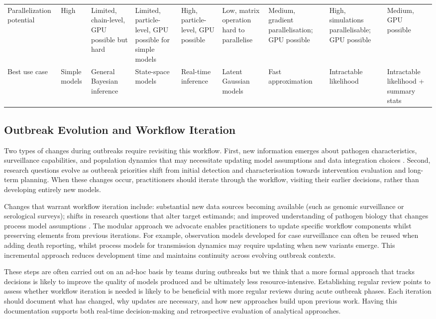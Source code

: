 \documentclass{article}
\begin{document}
\begin{landscape}
\begin{table}[ht]
\begin{tabular}{@{}p{3.2cm}p{1.5cm}p{1.5cm}p{1.5cm}p{1.5cm}p{1.5cm}p{1.5cm}p{1.5cm}p{1.5cm}@{}}
Parallelization potential & 
High & 
Limited, chain-level, GPU possible but hard & 
Limited, particle-level, GPU possible for simple models & 
High, particle-level, GPU possible & 
Low, matrix operation hard to parallelise & 
Medium, gradient parallelisation; GPU possible & 
High, simulations parallelisable; GPU possible & 
Medium, GPU possible \\
Best use case & Simple models & General Bayesian inference & State-space models & Real-time inference & Latent Gaussian models & Fast approximation & Intractable likelihood & Intractable likelihood + summary stats \\
\bottomrule
\end{tabular}
\end{table}
\end{landscape}

\subsection{Outbreak Evolution and Workflow Iteration}
Two types of changes during outbreaks require revisiting this workflow.
First, new information emerges about pathogen characteristics, surveillance capabilities, and population dynamics that may necessitate updating model assumptions and data integration choices \citep{mccaw2023role}.
Second, research questions evolve as outbreak priorities shift from initial detection and characterisation towards intervention evaluation and long-term planning.
When these changes occur, practitioners should iterate through the workflow, visiting their earlier decisions, rather than developing entirely new models.

Changes that warrant workflow iteration include: substantial new data sources becoming available (such as genomic surveillance or serological surveys); shifts in research questions that alter target estimands; and improved understanding of pathogen biology that changes process model assumptions \citep{knock2021key}.
The modular approach we advocate enables practitioners to update specific workflow components whilst preserving elements from previous iterations.
For example, observation models developed for case surveillance can often be reused when adding death reporting, whilst process models for transmission dynamics may require updating when new variants emerge.
This incremental approach reduces development time and maintains continuity across evolving outbreak contexts.

These steps are often carried out on an ad-hoc basis by teams during outbreaks but we think that a more formal approach that tracks decisions is likely to improve the quality of models produced and be ultimately less resource-intensive.
Establishing regular review points to assess whether workflow iteration is needed is likely to be beneficial with more regular reviews during acute outbreak phases.
Each iteration should document what has changed, why updates are necessary, and how new approaches build upon previous work.
Having this documentation supports both real-time decision-making and retrospective evaluation of analytical approaches.
\end{document}
